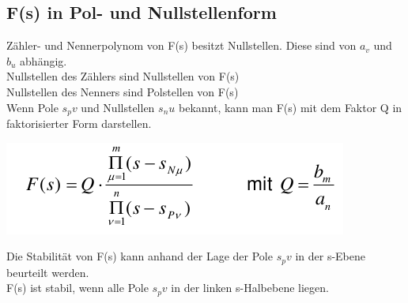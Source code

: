 \documentclass[10pt,a4paper]{article}
\begin{document}
\subsection{F(s) in Pol- und Nullstellenform}
\begin{mdframed}[style=exercise]
        Zähler- und Nennerpolynom von F(s) besitzt Nullstellen. Diese sind von $a_v$ und $b_u$ abhängig.\\
        Nullstellen des Zählers sind Nullstellen von F(s)\\
        Nullstellen des Nenners sind Polstellen von F(s)\\
        Wenn Pole $s_pv$ und Nullstellen $s_nu$ bekannt, kann man F(s) mit dem Faktor Q in faktorisierter Form darstellen.
    \end{mdframed}
    \begin{center}
            \includegraphics[width=.35\textwidth]{Figures/PolNullstellenQ.png}
        \end{center}
        \begin{mdframed}[style=exercise]
        Die Stabilität von F(s) kann anhand der Lage der Pole $s_pv$ in der s-Ebene beurteilt werden.\\
        F(s) ist stabil, wenn alle Pole $s_pv$ in der linken s-Halbebene liegen.
    \end{mdframed}
\end{document}
